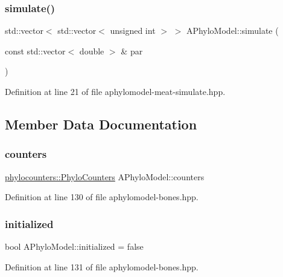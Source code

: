 \subsubsection{\texorpdfstring{simulate()}{simulate()}}
{\footnotesize\ttfamily std\+::vector$<$ std\+::vector$<$ unsigned int $>$ $>$ A\+Phylo\+Model\+::simulate (\begin{DoxyParamCaption}\item[{const std\+::vector$<$ double $>$ \&}]{par }\end{DoxyParamCaption})}



Definition at line 21 of file aphylomodel-\/meat-\/simulate.\+hpp.



\subsection{Member Data Documentation}
\mbox{\label{class_a_phylo_model_ac301d6887933072072bdf3472df5c8a3}} 
\subsubsection{\texorpdfstring{counters}{counters}}
{\footnotesize\ttfamily \hyperlink{namespacebarry_1_1counters_1_1phylo_a4e401ffe66d04091343dcffaf915f8c3}{phylocounters\+::\+Phylo\+Counters} A\+Phylo\+Model\+::counters}



Definition at line 130 of file aphylomodel-\/bones.\+hpp.

\mbox{\label{class_a_phylo_model_a298c38ef857994159589a6c0f7578150}} 
\subsubsection{\texorpdfstring{initialized}{initialized}}
{\footnotesize\ttfamily bool A\+Phylo\+Model\+::initialized = false}



Definition at line 131 of file aphylomodel-\/bones.\+hpp.

\mbox{\label{class_a_phylo_model_ae041cf2aa3630fab0a050e176c9317f9}} 
